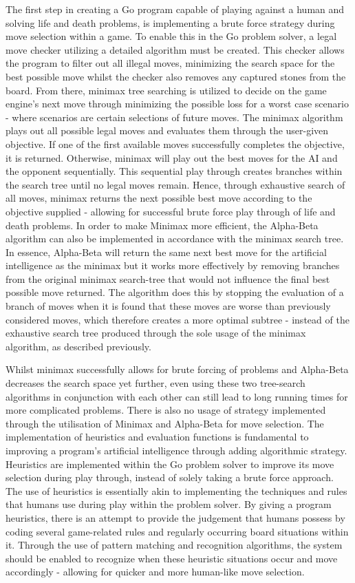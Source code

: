 \documentclass{l3proj}
\begin{document}
The first step in creating a Go program capable of playing against a human and solving life and death problems, is implementing a brute force strategy during move selection within a game. To enable this in the Go problem solver, a legal move checker utilizing a detailed algorithm must be created. This checker allows the program to filter out all illegal moves, minimizing the search space for the best possible move whilst the checker also removes any captured stones from the board. From there, minimax tree searching is utilized to decide on the game engine's next move through minimizing the possible loss for a worst case scenario - where scenarios are certain selections of future moves. The minimax algorithm plays out all possible legal moves and evaluates them through the user-given objective. If one of the first available moves successfully completes the objective, it is returned. Otherwise, minimax will play out the best moves for the AI and the opponent sequentially. This sequential play through creates branches within the search tree until no legal moves remain. Hence, through exhaustive search of all moves, minimax returns the next possible best move according to the objective supplied - allowing for successful brute force play through of life and death problems.
In order to make Minimax more efficient, the Alpha-Beta algorithm can also be implemented in accordance with the minimax search tree. In essence, Alpha-Beta will return the same next best move for the artificial intelligence as the minimax but it works more effectively by removing branches from the original minimax search-tree that would not influence the final best possible move returned. The algorithm does this by stopping the evaluation of a branch of moves when it is found that these moves are worse than previously considered moves, which therefore creates a more optimal subtree - instead of the exhaustive search tree produced through the sole usage of the minimax algorithm, as described previously.

Whilst minimax successfully allows for brute forcing of problems and Alpha-Beta decreases the search space yet further, even using these two tree-search algorithms in conjunction with each other can still lead to long running times for more complicated problems. There is also no usage of strategy implemented through the utilisation of Minimax and Alpha-Beta for move selection. The implementation of heuristics and evaluation functions is fundamental to improving a program's artificial intelligence through adding algorithmic strategy. Heuristics are implemented within the Go problem solver to improve its move selection during play through, instead of solely taking a brute force approach. The use of heuristics is essentially akin to implementing the techniques and rules that humans use during play within the problem solver. By giving a program heuristics, there is an attempt to provide the judgement that humans possess by coding several game-related rules and regularly occurring board situations within it. Through the use of pattern matching and recognition algorithms, the system should be enabled to recognize when these heuristic situations occur and move accordingly - allowing for quicker and more human-like move selection.
\end{document}
